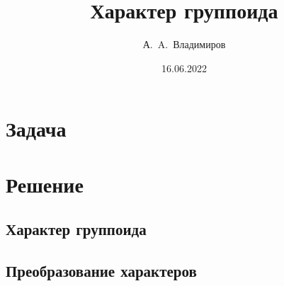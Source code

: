 \documentclass[11pt]{article}
\theoremstyle{plain}
\theoremstyle{definition}
\theoremstyle{remark}
\begin{document}
\author{А.~A.~Владимиров}
\title{Характер группоида}
\date{16.06.2022}
\maketitle

\section*{Задача}


\section*{Решение}
\tableofcontents

\newpage    \subsection{Характер группоида}
            
\newpage    
            

\newpage    \subsection{Преобразование характеров}
            
            
            
\end{document}
